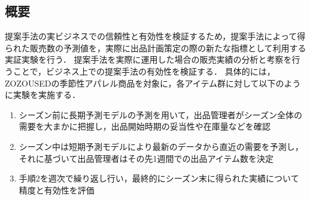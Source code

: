 \documentclass[dvipdfmx]{jreport}
\begin{document}
\subsection{概要}
提案手法の実ビジネスでの信頼性と有効性を検証するため，提案手法によって得られた販売数の予測値を，実際に出品計画策定の際の新たな指標として利用する実証実験を行う．
提案手法を実際に運用した場合の販売実績の分析と考察を行うことで，ビジネス上での提案手法の有効性を検証する．
具体的には，ZOZOUSEDの季節性アパレル商品を対象に，各アイテム群に対して以下のように実験を実施する．
\begin{tcolorbox}[title=\textbf{実証実験の手順}]
    \begin{enumerate}
        \item シーズン前に長期予測モデルの予測を用いて，出品管理者がシーズン全体の需要を大まかに把握し，出品開始時期の妥当性や在庫量などを確認
        \item シーズン中は短期予測モデルにより最新のデータから直近の需要を予測し，それに基づいて出品管理者はその先1週間での出品アイテム数を決定
        \item 手順2を週次で繰り返し行い，最終的にシーズン末に得られた実績について精度と有効性を評価
    \end{enumerate}
\end{tcolorbox}
\end{document}
